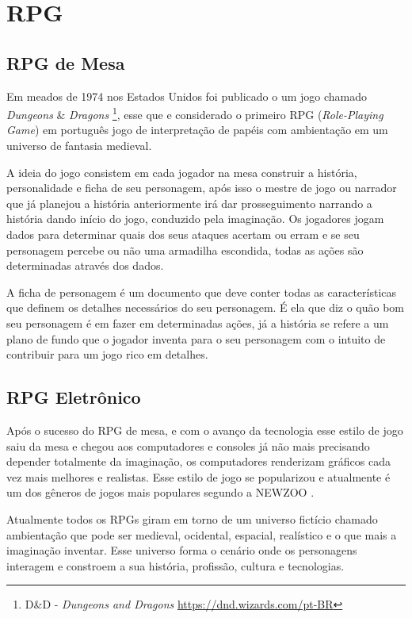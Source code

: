 \section{RPG}
\label{sec:rpg}
\subsection{RPG de Mesa}
\label{sec:rpg-de-mesa}
Em meados de 1974 nos Estados Unidos foi publicado o um jogo chamado \textit{Dungeons} \& \textit{Dragons} \footnote{D\&D - \textit{Dungeons and Dragons} \url{https://dnd.wizards.com/pt-BR}}, esse que e considerado o primeiro RPG (\textit{Role-Playing Game}) em português jogo de interpretação de papéis com ambientação em um universo de fantasia medieval.

A ideia do jogo consistem em cada jogador na mesa construir a história, personalidade e ficha de seu personagem, após isso o mestre de jogo ou narrador que já planejou a história anteriormente irá dar prosseguimento narrando a história dando início do jogo, conduzido pela imaginação. Os jogadores jogam dados para determinar quais dos seus ataques acertam ou erram e se seu personagem percebe ou não uma armadilha escondida, todas as ações são determinadas através dos dados. 

A ficha de personagem é um documento que deve conter todas as características que definem os detalhes necessários do seu personagem. É ela que diz o quão bom seu personagem é em fazer em determinadas ações, já a história se refere a um plano de fundo que o jogador inventa para o seu personagem com o intuito de contribuir para um jogo rico em detalhes. 

\subsection{RPG Eletrônico}
\label{sec:rpg-eletronico}
Após o sucesso do RPG de mesa, e com o avanço da tecnologia esse estilo de jogo saiu da mesa e chegou aos computadores e consoles já não mais precisando depender totalmente da imaginação, os computadores renderizam gráficos cada vez mais melhores e realistas. Esse estilo de jogo se popularizou e atualmente é um dos gêneros de jogos mais populares segundo a NEWZOO \cite{NEWZOO}.

Atualmente todos os RPGs giram em torno de um universo fictício chamado ambientação que pode ser medieval, ocidental, espacial, realístico e o que mais a imaginação inventar. Esse universo forma o cenário onde os personagens interagem e constroem a sua história, profissão, cultura e tecnologias. \cite{duflo1999jogo}

